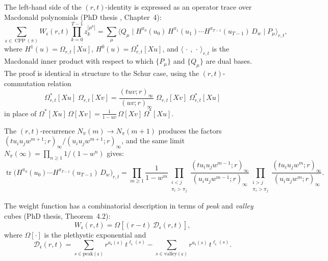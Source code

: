 \documentclass[11pt]{article}
\theoremstyle{plain}
\theoremstyle{definition}
\newcommand{\CPP}{\operatorname{CPP}}
\newcommand{\qpochn}[3]{(#1;#2)_{#3}}
\begin{document}
The left-hand side of the $(r,t)$-identity is expressed as an operator trace
over Macdonald polynomials (PhD thesis \cite{Langer-thesis}, Chapter~4):
\begin{equation}
  \sum_{\mathfrak{c} \in \CPP(\pi)}
  W_{\mathfrak{c}}(r,t)
  \prod_{k=0}^{T-1} z_k^{|\mu^k|}
  = \sum_\mu \langle Q_\mu \mid
    H^{\pi_0}(u_0)\, H^{\pi_1}(u_1) \cdots H^{\pi_{T-1}}(u_{T-1})\,
    D_w \mid P_\mu \rangle_{r,t},
  \label{eq:trace-mac}
\end{equation}
where $H^1(u) = \Omega_{r,t}[Xu]$, $H^0(u) = \Omega_{r,t}^*[Xu]$, and
$\langle\,\cdot\,,\,\cdot\,\rangle_{r,t}$ is the Macdonald inner product
with respect to which $\{P_\mu\}$ and $\{Q_\mu\}$ are dual bases.
The proof is identical in structure to the Schur case, using the
$(r,t)$-commutation relation
\[
  \Omega_{r,t}^*[Xu]\;\Omega_{r,t}[Xv]
  = \frac{\qpochn{tuv}{r}{\infty}}{\qpochn{uv}{r}{\infty}}
  \;\Omega_{r,t}[Xv]\;\Omega_{r,t}^*[Xu]
\]
in place of $\Omega^*[Xu]\,\Omega[Xv] = \frac{1}{1-uv}\,\Omega[Xv]\,\Omega^*[Xu]$.

The $(r,t)$-recurrence $N_\pi(m) \to N_\pi(m+1)$ produces the factors
$\qpochn{tu_iu_jw^{m+1}}{r}{\infty}/\qpochn{u_iu_jw^{m+1}}{r}{\infty}$,
and the same limit $N_\pi(\infty) = \prod_{n \geq 1} 1/(1-w^n)$ gives:
\begin{equation}
  \operatorname{tr}\!\bigl(
  H^{\pi_0}(u_0) \cdots H^{\pi_{T-1}}(u_{T-1})\, D_w
  \bigr)_{r,t}
  = \prod_{m \geq 1} \frac{1}{1 - w^m}
  \prod_{\substack{i < j \\ \pi_i > \pi_j}}
    \frac{\qpochn{tu_iu_jw^{m-1}}{r}{\infty}}
         {\qpochn{u_iu_jw^{m-1}}{r}{\infty}}
  \prod_{\substack{i > j \\ \pi_i > \pi_j}}
    \frac{\qpochn{tu_iu_jw^m}{r}{\infty}}
         {\qpochn{u_iu_jw^m}{r}{\infty}}.
  \label{eq:rt-borodin-trace}
\end{equation}

The weight function has a combinatorial description in terms
of \emph{peak} and \emph{valley} cubes (PhD thesis, Theorem~4.2):
\begin{equation}
  W_{\mathfrak{c}}(r,t)
  = \Omega\!\left[(r - t)\,\mathcal{D}_{\mathfrak{c}}(r,t)\right],
  \label{eq:Wc-plethystic}
\end{equation}
where $\Omega[\cdot]$ is the plethystic exponential and
\[
  \mathcal{D}_{\mathfrak{c}}(r,t)
  = \sum_{s \in \mathrm{peak}(\mathfrak{c})}
    r^{a_{\mathfrak{c}}(s)}\, t^{\ell_{\mathfrak{c}}(s)}
  - \sum_{s \in \mathrm{valley}(\mathfrak{c})}
    r^{a_{\mathfrak{c}}(s)}\, t^{\ell_{\mathfrak{c}}(s)}.
\]
\end{document}
